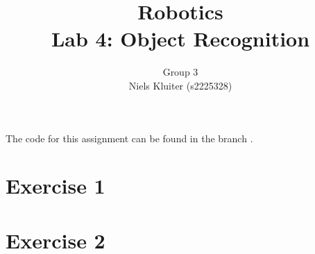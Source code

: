 \documentclass[a4paper]{article}
\title{Robotics\\ Lab 4: Object Recognition}
\author{Group 3\\ Niels Kluiter (s2225328)}
\begin{document}
\maketitle

\noindent The code for this assignment can be found in the branch .

\section*{Exercise 1}


\section*{Exercise 2}


\printbibliography

\clearpage
\appendix

\end{document}
